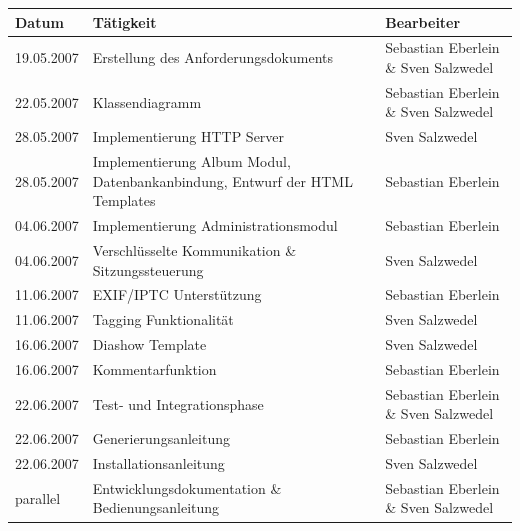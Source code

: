 \documentclass[a4paper,12pt,liststotocnumbered]{scrartcl}
\begin{document}
\begin{tabularx}{\textwidth}{|l|X|X|}

	\hline

	\textbf{Datum}&\textbf{Tätigkeit}&\textbf{Bearbeiter}\\

	\hline

	19.05.2007&Erstellung des Anforderungsdokuments&Sebastian Eberlein \&
	Sven Salzwedel\\

	\hline 
	
	22.05.2007&Klassendiagramm&Sebastian Eberlein \& Sven Salzwedel\\

	\hline

	28.05.2007&Implementierung HTTP Server&Sven Salzwedel\\

	\hline

	28.05.2007&Implementierung Album Modul, Datenbankanbindung, Entwurf
	der HTML Templates&Sebastian Eberlein\\
	
	\hline

	04.06.2007&Implementierung Administrationsmodul&Sebastian Eberlein\\

	\hline

	04.06.2007&Verschlüsselte Kommunikation \& Sitzungssteuerung&Sven
	Salzwedel\\

	\hline

	11.06.2007&EXIF/IPTC Unterstützung&Sebastian Eberlein\\

	\hline

	11.06.2007&Tagging Funktionalität&Sven Salzwedel\\

	\hline

	16.06.2007&Diashow Template&Sven Salzwedel\\

	\hline

	16.06.2007&Kommentarfunktion&Sebastian Eberlein\\

	\hline

	22.06.2007&Test- und Integrationsphase&Sebastian Eberlein \& Sven
	Salzwedel\\

	\hline

	22.06.2007&Generierungsanleitung&Sebastian Eberlein\\

	\hline

	22.06.2007&Installationsanleitung&Sven Salzwedel\\

	\hline

	parallel&Entwicklungsdokumentation \& Bedienungsanleitung&Sebastian
	Eberlein \& Sven Salzwedel\\

	\hline

\end{tabularx}
\end{document}
